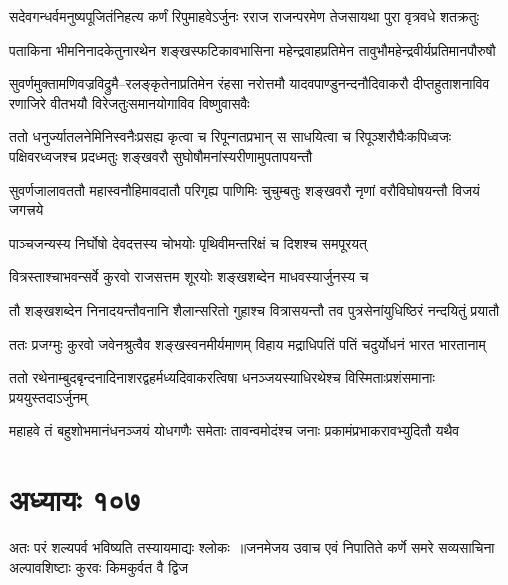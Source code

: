 \twolineshloka
{सदेवगन्धर्वमनुष्यपूजितंनिहत्य कर्णं रिपुमाहवेऽर्जुनः}
{रराज राजन्परमेण तेजसायथा पुरा वृत्रवधे शतक्रतुः}


\twolineshloka
{पताकिना भीमनिनादकेतुनारथेन शङ्खस्फटिकावभासिना}
{महेन्द्रवाहप्रतिमेन तावुभौमहेन्द्रवीर्यप्रतिमानपौरुषौ}


\threelineshloka
{सुवर्णमुक्तामणिवज्रविद्रुमै--रलङ्कृतेनाप्रतिमेन रंहसा}
{नरोत्तमौ यादवपाण्डुनन्दनौदिवाकरौ दीप्तहुताशनाविव}
{रणाजिरे वीतभयौ विरेजतुःसमानयोगाविव विष्णुवासवैः}


\threelineshloka
{ततो धनुर्ज्यातलनेमिनिस्वनैःप्रसह्य कृत्वा च रिपून्गतप्रभान्}
{स साधयित्वा च रिपूञ्शरौघैःकपिध्वजः पक्षिवरध्वजश्च}
{प्रदध्मतुः शङ्खवरौ सुघोषौमनांस्यरीणामुपतापयन्तौ}


\twolineshloka
{सुवर्णजालावततौ महास्वनौहिमावदातौ परिगृह्य पाणिमिः}
{चुचुम्बतुः शङ्खवरौ नृणां वरौविघोषयन्तौ विजयं जगत्त्रये}


\twolineshloka
{पाञ्चजन्यस्य निर्घोषो देवदत्तस्य चोभयोः}
{पृथिवीमन्तरिक्षं च दिशश्च समपूरयत्}


\twolineshloka
{वित्रस्ताश्चाभवन्सर्वे कुरवो राजसत्तम}
{शूरयोः शङ्खशब्देन माधवस्यार्जुनस्य च}


\twolineshloka
{तौ शङ्खशब्देन निनादयन्तौवनानि शैलान्सरितो गुहाश्च}
{वित्रासयन्तौ तव पुत्रसेनांयुधिष्ठिरं नन्दयितुं प्रयातौ}


\twolineshloka
{ततः प्रजग्मुः कुरवो जवेनश्रुत्वैव शङ्खस्वनमीर्यमाणम्}
{विहाय मद्राधिपतिं पतिं चदुर्योधनं भारत भारतानाम्}


\twolineshloka
{ततो रथेनाम्बुदबृन्दनादिनाशरद्वहर्मध्यदिवाकरत्विषा}
{धनञ्जयस्याधिरथेश्च विस्मिताःप्रशंसमानाः प्रययुस्तदाऽर्जुनम्}


\twolineshloka
{महाहवे तं बहुशोभमानंधनञ्जयं योधगणैः समेताः}
{तावन्वमोदंश्च जनाः प्रकामंप्रभाकरावभ्युदितौ यथैव}


\chapter{अध्यायः १०७}
\fourlineindentedshloka
{अतः परं शल्यपर्व भविष्यति}
{तस्यायमाद्यः श्लोकः ॥जनमेजय उवाच}
{एवं निपातिते कर्णे समरे सव्यसाचिना}
{अल्पावशिष्टाः कुरवः किमकुर्वत वै द्विज}


